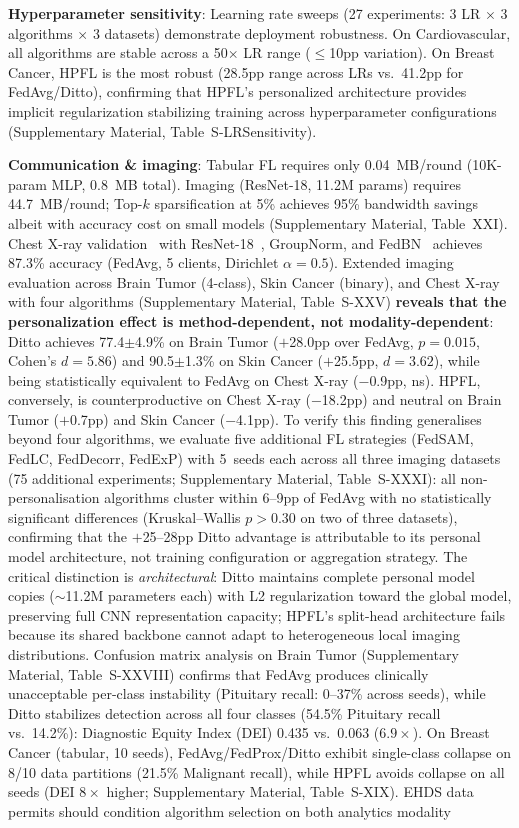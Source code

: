 \documentclass[conference,a4paper]{IEEEtran}
\begin{document}
\textbf{Hyperparameter sensitivity}: Learning rate sweeps (27 experiments: 3 LR $\times$ 3 algorithms $\times$ 3 datasets) demonstrate deployment robustness. On Cardiovascular, all algorithms are stable across a 50$\times$ LR range ($\leq$10pp variation). On Breast Cancer, HPFL is the most robust (28.5pp range across LRs vs.\ 41.2pp for FedAvg/Ditto), confirming that HPFL's personalized architecture provides implicit regularization stabilizing training across hyperparameter configurations (Supplementary Material, Table~S-LRSensitivity).

\textbf{Communication \& imaging}: Tabular FL requires only 0.04~MB/round (10K-param MLP, 0.8~MB total). Imaging (ResNet-18, 11.2M params) requires 44.7~MB/round; Top-$k$ sparsification at 5\% achieves 95\% bandwidth savings albeit with accuracy cost on small models (Supplementary Material, Table~XXI). Chest X-ray validation~\cite{chestxray2018} with ResNet-18~\cite{he2016deep}, GroupNorm, and FedBN~\cite{li2021fedbn} achieves 87.3\% accuracy (FedAvg, 5 clients, Dirichlet $\alpha{=}0.5$). Extended imaging evaluation across Brain Tumor (4-class), Skin Cancer (binary), and Chest X-ray with four algorithms (Supplementary Material, Table~S-XXV) \textbf{reveals that the personalization effect is method-dependent, not modality-dependent}: Ditto achieves 77.4$\pm$4.9\% on Brain Tumor ($+$28.0pp over FedAvg, $p{=}0.015$, Cohen's $d{=}5.86$) and 90.5$\pm$1.3\% on Skin Cancer ($+$25.5pp, $d{=}3.62$), while being statistically equivalent to FedAvg on Chest X-ray ($-$0.9pp, ns). HPFL, conversely, is counterproductive on Chest X-ray ($-$18.2pp) and neutral on Brain Tumor ($+$0.7pp) and Skin Cancer ($-$4.1pp). To verify this finding generalises beyond four algorithms, we evaluate five additional FL strategies (FedSAM, FedLC, FedDecorr, FedExP) with 5~seeds each across all three imaging datasets (75 additional experiments; Supplementary Material, Table~S-XXXI): all non-personalisation algorithms cluster within 6--9pp of FedAvg with no statistically significant differences (Kruskal--Wallis $p{>}0.30$ on two of three datasets), confirming that the $+$25--28pp Ditto advantage is attributable to its personal model architecture, not training configuration or aggregation strategy. The critical distinction is \textit{architectural}: Ditto maintains complete personal model copies ($\sim$11.2M parameters each) with L2 regularization toward the global model, preserving full CNN representation capacity; HPFL's split-head architecture fails because its shared backbone cannot adapt to heterogeneous local imaging distributions. Confusion matrix analysis on Brain Tumor (Supplementary Material, Table~S-XXVIII) confirms that FedAvg produces clinically unacceptable per-class instability (Pituitary recall: 0--37\% across seeds), while Ditto stabilizes detection across all four classes (54.5\% Pituitary recall vs.\ 14.2\%): Diagnostic Equity Index (DEI) 0.435 vs.\ 0.063 ($6.9\times$). On Breast Cancer (tabular, 10 seeds), FedAvg/FedProx/Ditto exhibit single-class collapse on 8/10 data partitions (21.5\% Malignant recall), while HPFL avoids collapse on all seeds (DEI $8\times$ higher; Supplementary Material, Table~S-XIX). EHDS data permits should condition algorithm selection on both analytics modality 
\end{document}
